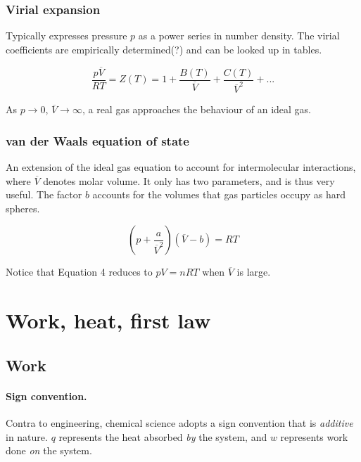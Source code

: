 \documentclass{article}
\numberwithin{theorem}{section}
\numberwithin{corollary}{section}
\numberwithin{postulate}{section}
\numberwithin{lemma}{section}
\numberwithin{definition}{section}
\begin{document}
\subsubsection{Virial expansion}

Typically expresses pressure $p$ as a power series in number density. The virial coefficients are empirically determined(?) and can be looked up in tables.

\begin{equation}
  \frac{p \overline{V}}{RT} = Z(T) = 1 + \frac{B(T)}{\overline{V}} +
  \frac{C(T)}{\overline{V}^2} + ...
\end{equation}

As $p \rightarrow 0$, $\overline{V} \rightarrow \infty$, a real gas
approaches the behaviour of an ideal gas.

\subsubsection{van der Waals equation of state}

An extension of the ideal gas equation to account for intermolecular interactions,
where $\overline{V}$ denotes molar volume. It only has two parameters, and is
thus very useful. The factor $b$ accounts for the volumes that gas particles
occupy as hard spheres.

\begin{equation}
  \left( p + \frac{a}{\overline{V}^2} \right) (\overline{V} - b) = RT 
\end{equation}

Notice that Equation 4 reduces to $pV = nRT$ when $\overline{V}$ is large.

\section{Work, heat, first law}

\subsection{Work}

\paragraph{Sign convention. }Contra to engineering, chemical science adopts
a sign convention that is \textit{additive} in nature. $q$ represents the heat
absorbed \textit{by} the system, and $w$ represents work done \textit{on} the
system.
\end{document}
